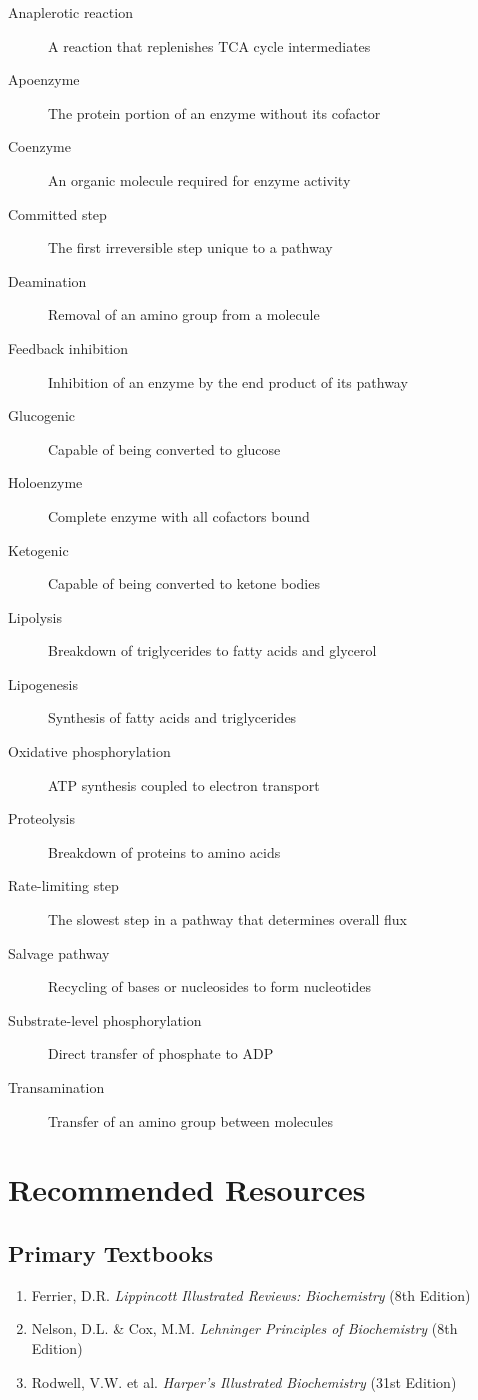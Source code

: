 \begin{description}
    \item[Anaplerotic reaction] A reaction that replenishes TCA cycle intermediates
    \item[Apoenzyme] The protein portion of an enzyme without its cofactor
    \item[Coenzyme] An organic molecule required for enzyme activity
    \item[Committed step] The first irreversible step unique to a pathway
    \item[Deamination] Removal of an amino group from a molecule
    \item[Feedback inhibition] Inhibition of an enzyme by the end product of its pathway
    \item[Glucogenic] Capable of being converted to glucose
    \item[Holoenzyme] Complete enzyme with all cofactors bound
    \item[Ketogenic] Capable of being converted to ketone bodies
    \item[Lipolysis] Breakdown of triglycerides to fatty acids and glycerol
    \item[Lipogenesis] Synthesis of fatty acids and triglycerides
    \item[Oxidative phosphorylation] ATP synthesis coupled to electron transport
    \item[Proteolysis] Breakdown of proteins to amino acids
    \item[Rate-limiting step] The slowest step in a pathway that determines overall flux
    \item[Salvage pathway] Recycling of bases or nucleosides to form nucleotides
    \item[Substrate-level phosphorylation] Direct transfer of phosphate to ADP
    \item[Transamination] Transfer of an amino group between molecules
\end{description}


\section{Recommended Resources}

\subsection{Primary Textbooks}
\begin{enumerate}
    \item Ferrier, D.R. \textit{Lippincott Illustrated Reviews: Biochemistry} (8th Edition)
    \item Nelson, D.L. \& Cox, M.M. \textit{Lehninger Principles of Biochemistry} (8th Edition)
    \item Rodwell, V.W. et al. \textit{Harper's Illustrated Biochemistry} (31st Edition)
\end{enumerate}

